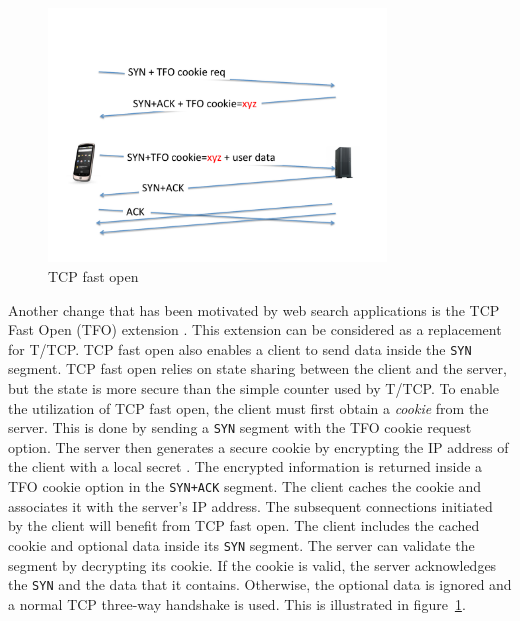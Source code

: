 \begin{figure}
\begin{center}
\includegraphics[width=0.8\textwidth]{figures/mptcp-ebook/Diapositive12.pdf}
\end{center}
\caption{TCP fast open}\label{fig:tcp-fastopen}
\end{figure}


Another change that has been motivated by web search applications is the TCP Fast Open (TFO) extension \cite{radhakrishnan2011tcp}. This extension can be considered as a replacement for T/TCP. TCP fast open also enables a client to send data inside the \texttt{SYN} segment. TCP fast open relies on state sharing between the client and the server, but the state is more secure than the simple counter used by T/TCP. To enable the utilization of TCP fast open, the client must first obtain a \emph{cookie} from the server. This is done by sending a \texttt{SYN} segment with the TFO cookie request option. The server then generates a secure cookie by encrypting the IP address of the client with a local secret \cite{radhakrishnan2011tcp}. The encrypted information is returned inside a TFO cookie option in the \texttt{SYN+ACK} segment. The client caches the cookie and associates it with the server's IP address. The subsequent connections initiated by the client will benefit from TCP fast open. The client includes the cached cookie and optional data inside its \texttt{SYN} segment. The server can validate the segment by decrypting its cookie. If the cookie is valid, the server acknowledges the \texttt{SYN} and the data that it contains. Otherwise, the optional data is ignored and a normal TCP three-way handshake is used. This is illustrated in figure~\ref{fig:tcp-fastopen}.


